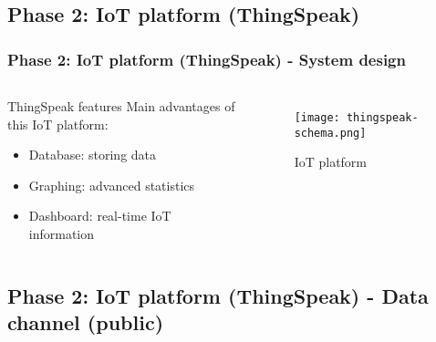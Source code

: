 \documentclass[
    aspectratio=169,                   %
]{beamer}
\begin{document}
\subsection{Phase 2: IoT platform (ThingSpeak)}

    \begin{frame}
        \frametitle{Phase 2: IoT platform (ThingSpeak) - System design}

        \begin{columns}[T,onlytextwidth]
              \begin{block}{ThingSpeak features}
                Main advantages of this IoT platform:
                \begin{itemize}
                    \item \alert{Database}: storing data
                    \item \alert{Graphing}: advanced statistics
                    \item \alert{Dashboard}: real-time IoT information
                \end{itemize}
              \end{block}
            \begin{figure}
                \centering
                \begin{stampbox}
                    \texttt{[image: thingspeak-schema.png]}
                \end{stampbox}
                \caption{IoT platform}
            \end{figure}       
        \end{columns}

    \end{frame}

\subsection{Phase 2: IoT platform (ThingSpeak) - Data channel (public)}
\end{document}
